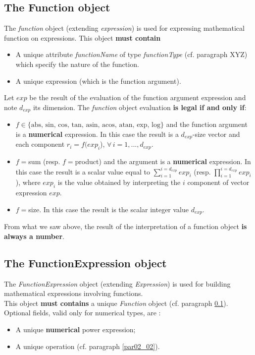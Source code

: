 \documentclass[a4paper,11pt] {article}
\begin{document}
\subsection{The Function object}\label{par02_05}
The {\it function} object (extending {\it expression}) is used for expressing mathematical function on expressions.
This object {\bf must contain} 
\begin{itemize}
\item A unique attribute {\it functionName} of type {\it functionType} (cf. paragraph XYZ) which specify the nature of the function.
\item A unique expression (which is the function argument).\\
\end{itemize}
Let $exp$ be the result of the evaluation of the function argument expression and note $d_{exp}$ its dimension.
The {\it function} object evaluation {\bf is legal if and only if}:
\begin{itemize}
\item $f  \in \{ \mbox{abs, sin, cos, tan, asin, acos, atan, exp, log} \}$ and the function argument is a {\bf numerical} expression. In this case the  result  is a $d_{exp}$-size vector and each component  $r_i = f(exp_i$), $\forall \, i=1,...,d_{exp}$.
\item $f=$sum (resp. $f=$product) and the argument is a {\bf numerical} expression. In this case the result is a scalar value equal to $\sum_{i=1}^{i=d_{exp}} exp_i$ (resp. $\prod _{i=1}^{i=d_{exp}} exp_i$), where $exp_i$ is the value obtained 
by interpreting the $i$ component of vector expression $exp$.
\item $f=$size. In this case the result is the scalar integer value $d_{exp}$. 
\end{itemize}
From what we saw above, the result of the interpretation of a function object { \bf is always a number}.

\subsection{The FunctionExpression object} 
The {\it FunctionExpression} object (extending {\it Expression}) is used for building mathematical expressions involving functions.\\
This object {\bf must contains} a unique {\it Function} object (cf. paragraph \ref{par02_05}).\\
Optional fields, valid only for numerical types, are : 
\begin{itemize}
\item A unique {\bf numerical} power expression;
\item A unique operation (cf. paragraph \ref{par02_02}).\\
\end{itemize}
\end{document}
